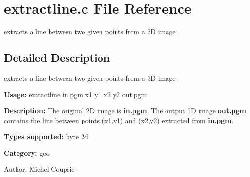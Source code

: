 \section{extractline.c File Reference}
\label{extractline_8c}
extracts a line between two given points from a 3D image  




\label{_details}
\subsection{Detailed Description}
extracts a line between two given points from a 3D image 

{\bf Usage:} extractline in.pgm x1 y1 x2 y2 out.pgm

{\bf Description:} The original 2D image is {\bf in.pgm}. The output 1D image {\bf out.pgm} contains the line between points (x1,y1) and (x2,y2) extracted from {\bf in.pgm}.

{\bf Types supported:} byte 2d

{\bf Category:} geo

\begin{Desc}
\item[Author:]Michel Couprie \end{Desc}
